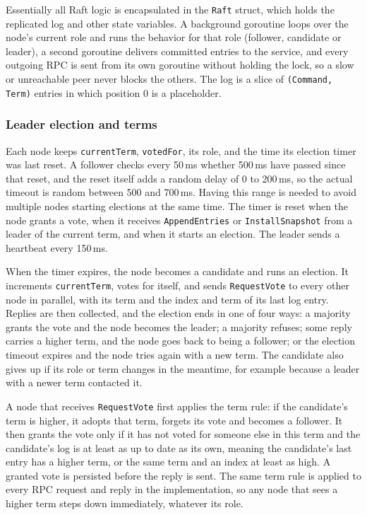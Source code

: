 \documentclass[conference]{IEEEtran}
\begin{document}
Essentially all Raft logic is encapsulated in the \texttt{Raft} struct, which holds the replicated log and other state variables. A background goroutine loops over the node's current role and runs the behavior for that role (follower, candidate or leader), a second goroutine delivers committed entries to the service, and every outgoing RPC is sent from its own goroutine without holding the lock, so a slow or unreachable peer never blocks the others. The log is a slice of \texttt{(Command, Term)} entries in which position 0 is a placeholder.

\subsubsection{\textbf{Leader election and terms}}
\label{sec:algs-election}
Each node keeps \texttt{currentTerm}, \texttt{votedFor}, its role, and the time its election timer was last reset. A follower checks every 50\,ms whether 500\,ms have passed since that reset, and the reset itself adds a random delay of 0 to 200\,ms, so the actual timeout is random between 500 and 700\,ms. Having this range is needed to avoid multiple nodes starting elections at the same time. The timer is reset when the node grants a vote, when it receives \texttt{AppendEntries} or \texttt{InstallSnapshot} from a leader of the current term, and when it starts an election. The leader sends a heartbeat every 150\,ms.

When the timer expires, the node becomes a candidate and runs an election. It increments \texttt{currentTerm}, votes for itself, and sends \texttt{RequestVote} to every other node in parallel, with its term and the index and term of its last log entry. Replies are then collected, and the election ends in one of four ways: a majority grants the vote and the node becomes the leader; a majority refuses; some reply carries a higher term, and the node goes back to being a follower; or the election timeout expires and the node tries again with a new term. The candidate also gives up if its role or term changes in the meantime, for example because a leader with a newer term contacted it.

A node that receives \texttt{RequestVote} first applies the term rule: if the candidate's term is higher, it adopts that term, forgets its vote and becomes a follower. It then grants the vote only if it has not voted for someone else in this term and the candidate's log is at least as up to date as its own, meaning the candidate's last entry has a higher term, or the same term and an index at least as high. A granted vote is persisted before the reply is sent. The same term rule is applied to every RPC request and reply in the implementation, so any node that sees a higher term steps down immediately, whatever its role.
\end{document}
